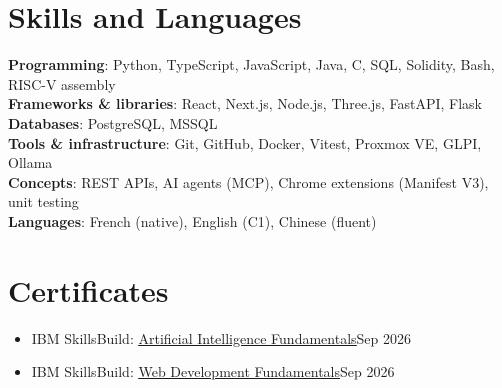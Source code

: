 \documentclass[letterpaper,11pt]{article}
\newcommand{\resumeDegreeItem}[2]{
  \item\small{#1\hfill#2\vspace{-2pt}}
}
\newcommand{\resumeItemListStart}{\begin{itemize}[labelindent=0.1in, leftmargin=*]}
\newcommand{\resumeItemListEnd}{\end{itemize}\vspace{-5pt}}
\begin{document}
%
\section{Skills and Languages}
 \begin{itemize}[leftmargin=0pt, label={}]
    \small{\item{
     \textbf{Programming}{: Python, TypeScript, JavaScript, Java, C, SQL, Solidity, Bash, RISC-V assembly} \\
     \textbf{Frameworks \& libraries}{: React, Next.js, Node.js, Three.js, FastAPI, Flask} \\
     \textbf{Databases}{: PostgreSQL, MSSQL} \\
     \textbf{Tools \& infrastructure}{: Git, GitHub, Docker, Vitest, Proxmox VE, GLPI, Ollama} \\
     \textbf{Concepts}{: REST APIs, AI agents (MCP), Chrome extensions (Manifest V3), unit testing} \\
     \textbf{Languages}{: French (native), English (C1), Chinese (fluent)}
    }}
 \end{itemize}


\section{Certificates}
  \resumeItemListStart
    \resumeDegreeItem{IBM SkillsBuild: \href{https://www.credly.com/badges/f42f2621-21d8-478a-9dae-b04f33677714/public_url}{\underline{Artificial Intelligence Fundamentals}}}{Sep 2026}
    \resumeDegreeItem{IBM SkillsBuild: \href{https://www.credly.com/badges/942aa2ea-c60e-4343-9da9-fcaad618f717/public_url}{\underline{Web Development Fundamentals}}}{Sep 2026}
  \resumeItemListEnd


\end{document}
